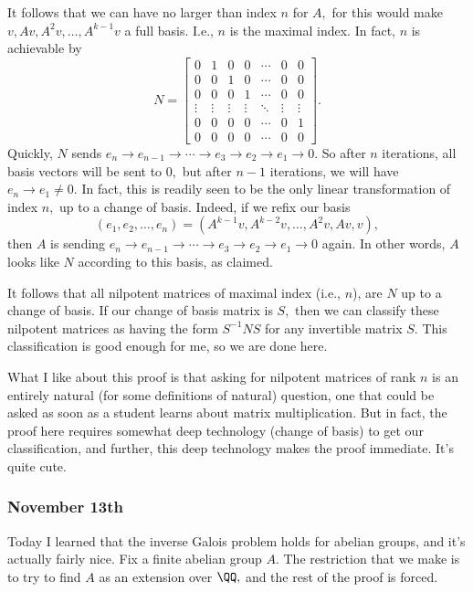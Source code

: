 It follows that we can have no larger than index $n$ for $A,$ for this would make $v,Av,A^2v,\ldots,A^{k-1}v$ a full basis. I.e., $n$ is the maximal index. In fact, $n$ is achievable by
\[N=\begin{bmatrix}
    0 & 1 & 0 & 0 & \cdots & 0 & 0 \\
    0 & 0 & 1 & 0 & \cdots & 0 & 0 \\
    0 & 0 & 0 & 1 & \cdots & 0 & 0 \\
    \vdots & \vdots & \vdots & \vdots & \ddots & \vdots & \vdots \\
    0 & 0 & 0 & 0 & \cdots & 0 & 1 \\
    0 & 0 & 0 & 0 & \cdots & 0 & 0
\end{bmatrix}.\]
Quickly, $N$ sends $e_n\to e_{n-1}\to\cdots\to e_3\to e_2\to e_1\to0.$ So after $n$ iterations, all basis vectors will be sent to $0,$ but after $n-1$ iterations, we will have $e_n\to e_1\ne0.$ In fact, this is readily seen to be the only linear transformation of index $n,$ up to a change of basis. Indeed, if we refix our basis
\[(e_1,e_2,\ldots,e_n)=\left(A^{k-1}v,A^{k-2}v,\ldots,A^2v,Av,v\right),\]
then $A$ is sending $e_n\to e_{n-1}\to\cdots\to e_3\to e_2\to e_1\to0$ again. In other words, $A$ looks like $N$ according to this basis, as claimed.

It follows that all nilpotent matrices of maximal index (i.e., $n$), are $N$ up to a change of basis. If our change of basis matrix is $S,$ then we can classify these nilpotent matrices as having the form $S^{-1}NS$ for any invertible matrix $S.$ This classification is good enough for me, so we are done here.

What I like about this proof is that asking for nilpotent matrices of rank $n$ is an entirely natural (for some definitions of natural) question, one that could be asked as soon as a student learns about matrix multiplication. But in fact, the proof here requires somewhat deep technology (change of basis) to get our classification, and further, this deep technology makes the proof immediate. It's quite cute.

\subsubsection{November 13th}
Today I learned that the inverse Galois problem holds for abelian groups, and it's actually fairly nice. Fix a finite abelian group $A.$ The restriction that we make is to try to find $A$ as an extension over $\QQ,$ and the rest of the proof is forced.

